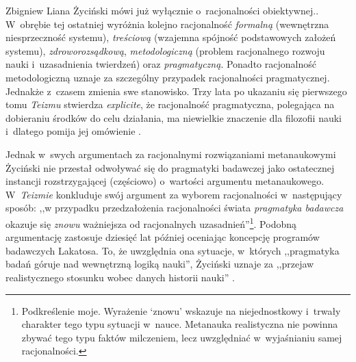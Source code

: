 \begin{artplenv}{Zbigniew Liana}
{%
\parencites*[][s.~248–251]{zycinski_elementy_1996}[][s.~336–340]{zycinski_elementy_2015} %
 Życiński mówi już wyłącznie o~racjonalności obiektywnej.}. W~obrębie tej ostatniej wyróżnia kolejno racjonalność \textit{formalną} (wewnętrzna niesprzeczność systemu), \textit{treściową} (wzajemna spójność podstawowych założeń systemu), \textit{zdroworozsądkową}, \textit{metodologiczną} (problem racjonalnego rozwoju nauki i~uzasadnienia twierdzeń) oraz \textit{pragmatyczną}. Ponadto racjonalność metodologiczną uznaje za szczególny przypadek racjonalności pragmatycznej. Jednakże z~czasem zmienia swe stanowisko. Trzy lata po ukazaniu się pierwszego tomu \textit{Teizmu} stwierdza \textit{explicite}, że racjonalność pragmatyczna, polegająca na dobieraniu środków do celu działania, ma niewielkie znaczenie dla filozofii nauki i~dlatego pomija jej omówienie 
\parencites[][s.~134]{zycinski_structure_1988}[][s.~237]{zycinski_struktura_2013_liana}.%


Jednak w~swych argumentach za racjonalnymi rozwiązaniami metanaukowymi Życiński nie przestał odwoływać się do pragmatyki badawczej jako ostatecznej instancji rozstrzygającej (częściowo) o~wartości argumentu metanaukowego. W~\textit{Teizmie}
\parencite*[][s.~194]{zycinski_teizm_1985} %
 konkluduje swój argument za wyborem racjonalności w~następujący sposób: ,,w przypadku przedzałożenia racjonalności świata \textit{pragmatyka badawcza} okazuje się \textit{znowu} ważniejsza od racjonalnych uzasadnień''\footnote{Podkreślenie moje.  Wyrażenie ‘znowu' wskazuje na niejednostkowy i~trwały charakter tego typu sytuacji w~nauce. Metanauka realistyczna nie powinna zbywać tego typu faktów milczeniem, lecz uwzględniać w~wyjaśnianiu samej racjonalności.}. Podobną argumentację zastosuje dziesięć lat później oceniając koncepcję programów badawczych Lakatosa. To, że uwzględnia ona sytuacje, w~których ,,pragmatyka badań góruje nad wewnętrzną logiką nauki'', Życiński uznaje za ,,przejaw realistycznego stosunku wobec danych historii nauki'' 
\parencites[][s.~243]{zycinski_elementy_1996}[][s.~330]{zycinski_elementy_2015}.%



\end{artplenv}
